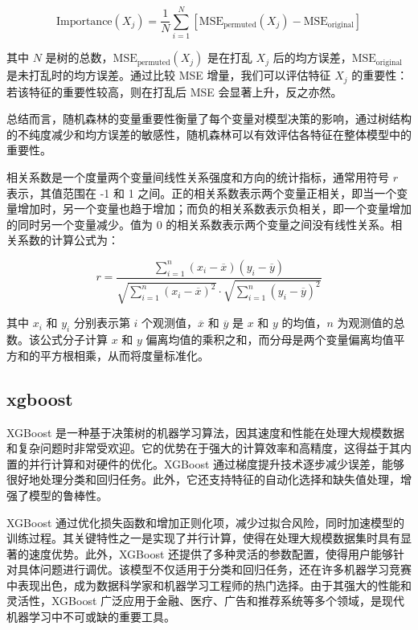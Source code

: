 \documentclass[AutoFakeBold]{LZUThesis-PgD&PhD}
\begin{document}
	\[
	\text{Importance}(X_j) = \frac{1}{N} \sum_{i=1}^{N} \left[ \text{MSE}_{\text{permuted}}(X_j) - \text{MSE}_{\text{original}} \right]
	\]
	
	其中 \( N \) 是树的总数，\( \text{MSE}_{\text{permuted}}(X_j) \) 是在打乱 \( X_j \) 后的均方误差，\( \text{MSE}_{\text{original}} \) 是未打乱时的均方误差。通过比较 MSE 增量，我们可以评估特征 \( X_j \) 的重要性：若该特征的重要性较高，则在打乱后 MSE 会显著上升，反之亦然。
	
	总结而言，随机森林的变量重要性衡量了每个变量对模型决策的影响，通过树结构的不纯度减少和均方误差的敏感性，随机森林可以有效评估各特征在整体模型中的重要性。
	
	相关系数是一个度量两个变量间线性关系强度和方向的统计指标，通常用符号 \( r \) 表示，其值范围在 -1 和 1 之间。正的相关系数表示两个变量正相关，即当一个变量增加时，另一个变量也趋于增加；而负的相关系数表示负相关，即一个变量增加的同时另一个变量减少。值为 0 的相关系数表示两个变量之间没有线性关系。相关系数的计算公式为：
	
	\[
	r = \frac{\sum_{i=1}^{n} (x_i - \overline{x})(y_i - \overline{y})}{\sqrt{\sum_{i=1}^{n} (x_i - \overline{x})^2} \cdot \sqrt{\sum_{i=1}^{n} (y_i - \overline{y})^2}}
	\]
	
	其中 \( x_i \) 和 \( y_i \) 分别表示第 \( i \) 个观测值，\( \overline{x} \) 和 \( \overline{y} \) 是 \( x \) 和 \( y \) 的均值，\( n \) 为观测值的总数。该公式分子计算 \( x \) 和 \( y \) 偏离均值的乘积之和，而分母是两个变量偏离均值平方和的平方根相乘，从而将度量标准化。
	
	
	
	\subsection{xgboost}
	XGBoost 是一种基于决策树的机器学习算法，因其速度和性能在处理大规模数据和复杂问题时非常受欢迎。它的优势在于强大的计算效率和高精度，这得益于其内置的并行计算和对硬件的优化。XGBoost 通过梯度提升技术逐步减少误差，能够很好地处理分类和回归任务。此外，它还支持特征的自动化选择和缺失值处理，增强了模型的鲁棒性。
	
	XGBoost 通过优化损失函数和增加正则化项，减少过拟合风险，同时加速模型的训练过程。其关键特性之一是实现了并行计算，使得在处理大规模数据集时具有显著的速度优势。此外，XGBoost 还提供了多种灵活的参数配置，使得用户能够针对具体问题进行调优。该模型不仅适用于分类和回归任务，还在许多机器学习竞赛中表现出色，成为数据科学家和机器学习工程师的热门选择。由于其强大的性能和灵活性，XGBoost 广泛应用于金融、医疗、广告和推荐系统等多个领域，是现代机器学习中不可或缺的重要工具。
	
\end{document}
